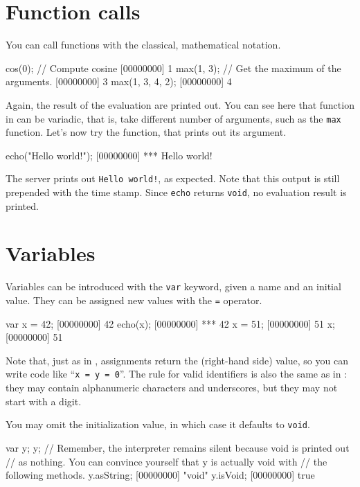 \section{Function calls}

You can call functions with the classical, mathematical notation.

\begin{urbiscript}
cos(0); // Compute cosine
[00000000] 1
max(1, 3); // Get the maximum of the arguments.
[00000000] 3
max(1, 3, 4, 2);
[00000000] 4
\end{urbiscript}

Again, the result of the evaluation are printed out. You can see here
that function in \us can be variadic, that is, take different number
of arguments, such as the \lstinline{max} function. Let's now try the
 function, that prints out its argument.

\begin{urbiscript}
echo("Hello world!");
[00000000] *** Hello world!
\end{urbiscript}

The server prints out \lstinline{Hello world!}, as expected. Note that this
output is still prepended with the time stamp. Since \lstinline{echo}
returns \lstinline{void}, no evaluation result is printed.

\section{Variables}
Variables can be introduced with the \lstinline{var} keyword, given a
name and an initial value. They can be assigned new values with the
\lstinline{=} operator.

\begin{urbiscript}
var x = 42;
[00000000] 42
echo(x);
[00000000] *** 42
x = 51;
[00000000] 51
x;
[00000000] 51
\end{urbiscript}

Note that, just as in \Cxx, assignments return the (right-hand side) value, so
you can write code like ``\lstinline|x = y = 0|''. The rule for valid
identifiers is also the same as in \Cxx: they may contain alphanumeric
characters and underscores, but they may not start with a digit.

You may omit the initialization value, in which case it defaults to
\lstinline|void|.

\begin{urbiscript}
var y;
y;
// Remember, the interpreter remains silent because void is printed out
// as nothing.  You can convince yourself that y is actually void with
// the following methods.
y.asString;
[00000000] "void"
y.isVoid;
[00000000] true
\end{urbiscript}

